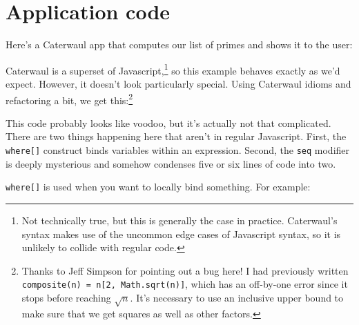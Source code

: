 \documentclass{report}
\begin{document}
\section{Application code}
    Here's a Caterwaul app that computes our list of primes and shows it to the user:


    Caterwaul is a superset of Javascript,\footnote{Not technically true, but this is generally the case in practice. Caterwaul's syntax makes use of the uncommon edge cases of Javascript
    syntax, so it is unlikely to collide with regular code.} so this example behaves exactly as we'd expect. However, it doesn't look particularly special. Using Caterwaul idioms and
    refactoring a bit, we get this:\footnote{Thanks to Jeff Simpson for pointing out a bug here! I had previously written {\tt composite(n) = n[2, Math.sqrt(n)]}, which has an off-by-one error
    since it stops before reaching $\sqrt n$. It's necessary to use an inclusive upper bound to make sure that we get squares as well as other factors.}


    This code probably looks like voodoo, but it's actually not that complicated. There are two things happening here that aren't in regular Javascript. First, the {\tt where[]} construct
    binds variables within an expression. Second, the {\tt seq} modifier is deeply mysterious and somehow condenses five or six lines of code into two.

    {\tt where[]} is used when you want to locally bind something. For example:
\end{document}
